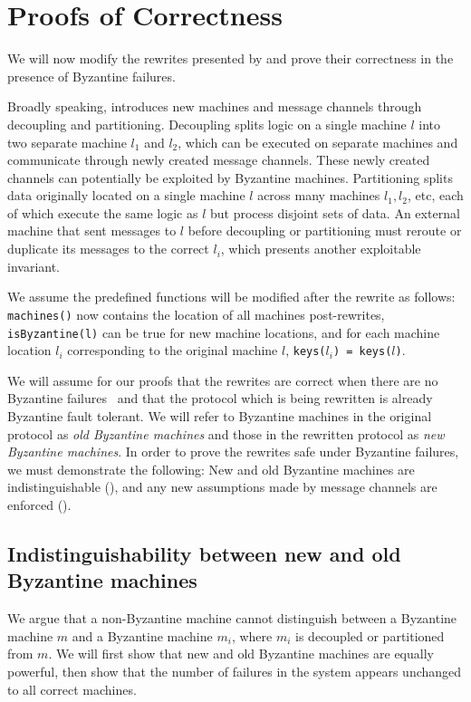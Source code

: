 \section{Proofs of Correctness}
\label{sec:proofs}
We will now modify the rewrites presented by \sigmodpaper{} and prove their correctness in the presence of Byzantine failures.

Broadly speaking, \sigmodpaper{} introduces new machines and message channels through decoupling and partitioning.
Decoupling splits logic on a single machine $l$ into two separate machine $l_1$ and $l_2$, which can be executed on separate machines and communicate through newly created message channels.
These newly created channels can potentially be exploited by Byzantine machines.
Partitioning splits data originally located on a single machine $l$ across many machines $l_1, l_2$, etc, each of which execute the same logic as $l$ but process disjoint sets of data.
An external machine that sent messages to $l$ before decoupling or partitioning must reroute or duplicate its messages to the correct $l_i$, which presents another exploitable invariant.

We assume the predefined functions will be modified after the rewrite as follows: \texttt{machines()} now contains the location of all machines post-rewrites, \texttt{isByzantine(l)} can be true for new machine locations, and for each machine location $l_i$ corresponding to the original machine $l$, \texttt{keys($l_i$) = keys($l$)}.

We will assume for our proofs that the rewrites are correct when there are no Byzantine failures~\cite{autocomp} and that the protocol which is being rewritten is already Byzantine fault tolerant.
We will refer to Byzantine machines in the original protocol as \emph{old Byzantine machines} and those in the rewritten protocol as \emph{new Byzantine machines}.
In order to prove the rewrites safe under Byzantine failures, we must demonstrate the following:
New and old Byzantine machines are indistinguishable (), and
any new assumptions made by message channels are enforced ().


\subsection{Indistinguishability between new and old Byzantine machines}
\label{sec:new-machines-fault-tolerance}
We argue that a non-Byzantine machine cannot distinguish between a Byzantine machine $m$ and a Byzantine machine $m_i$, where $m_i$ is decoupled or partitioned from $m$.
We will first show that new and old Byzantine machines are equally powerful, then show that the number of failures in the system appears unchanged to all correct machines.



